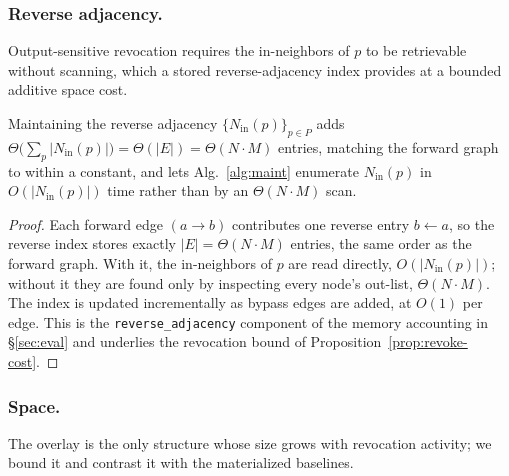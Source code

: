 \documentclass[sigconf, nonacm, review]{acmart}
\newcommand{\Nin}{N_{\mathrm{in}}}
\begin{document}
\subsubsection{Reverse adjacency.}
\label{app:cost-space}
Output-sensitive revocation requires the in-neighbors of $p$ to be retrievable
without scanning, which a stored reverse-adjacency index provides at a bounded
additive space cost.

\begin{proposition}
\label{prop:reverse-adj}
Maintaining the reverse adjacency $\{\Nin(p)\}_{p\in P}$ adds
$\Theta\big(\sum_{p}|\Nin(p)|\big)=\Theta(|E|)=\Theta(N\cdot M)$ entries,
matching the forward graph to within a constant, and lets
Alg.~\ref{alg:maint} enumerate $\Nin(p)$ in $O(|\Nin(p)|)$ time rather than by
an $\Theta(N\cdot M)$ scan.
\end{proposition}
\begin{proof}
Each forward edge $(a\to b)$ contributes one reverse entry $b\!\leftarrow\!a$,
so the reverse index stores exactly $|E|=\Theta(N\cdot M)$ entries, the same
order as the forward graph. With it, the in-neighbors of $p$ are read directly,
$O(|\Nin(p)|)$; without it they are found only by inspecting every node's
out-list, $\Theta(N\cdot M)$. The index is updated incrementally as bypass
edges are added, at $O(1)$ per edge. This is the
\texttt{reverse\_adjacency} component of the memory accounting in
\S\ref{sec:eval} and underlies the revocation bound of
Proposition~\ref{prop:revoke-cost}.
\end{proof}

\subsubsection{Space.}
\label{app:cost-mem}
The overlay is the only structure whose size grows with revocation activity;
we bound it and contrast it with the materialized baselines.
\end{document}
